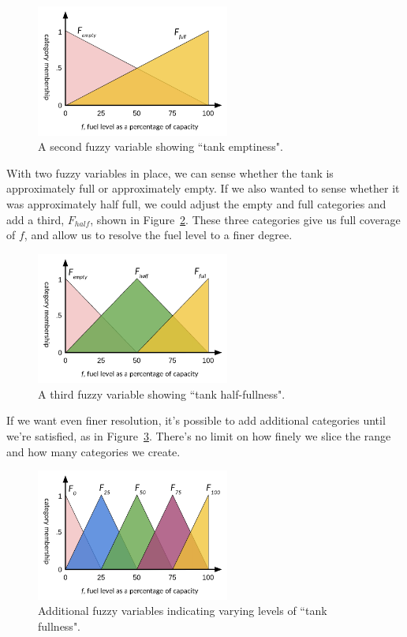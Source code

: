 \begin{figure}[ht]
\vskip 0.2in
\begin{center}
\centerline{\includegraphics[width=2.5in]{images/fuzzy2.png}}
\caption{A second fuzzy variable showing ``tank emptiness".}
\label{fig:fuzzy2}
\end{center}
\vskip -0.2in
\end{figure}

With two fuzzy variables in place, we can sense whether the tank is
approximately full or approximately empty. If we also wanted to sense whether
it was approximately half full, we could adjust the empty and full categories
and add a third, $F_{half}$, shown in Figure~\ref{fig:fuzzy3}.
These three categories give us full coverage
of $f$, and allow us to resolve the fuel level to a finer degree.

\begin{figure}[ht]
\vskip 0.2in
\begin{center}
\centerline{\includegraphics[width=2.5in]{images/fuzzy3.png}}
\caption{A third fuzzy variable showing ``tank half-fullness".}
\label{fig:fuzzy3}
\end{center}
\vskip -0.2in
\end{figure}

If we want even finer resolution, it's possible to add additional
categories until we're satisfied, as in Figure~\ref{fig:fuzzy5}.
There's no limit on how finely we slice
the range and how many categories we create.

\begin{figure}[ht]
\vskip 0.2in
\begin{center}
\centerline{\includegraphics[width=2.5in]{images/fuzzy5.png}}
\caption{Additional fuzzy variables indicating varying levels of
``tank fullness".}
\label{fig:fuzzy5}
\end{center}
\vskip -0.2in
\end{figure}

